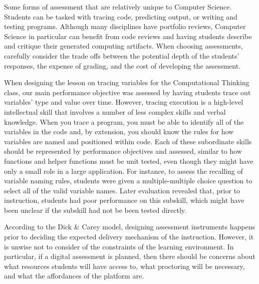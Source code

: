 Some forms of assessment that are relatively unique to Computer Science.
Students can be tasked with tracing code, predicting output, or writing and testing programs.
Although many disciplines have portfolio reviews, Computer Science in particular can benefit from code reviews and having students describe and critique their generated computing artifacts.
When choosing assessments, carefully consider the trade offs between the potential depth of the students' responses, the expense of grading, and the cost of developing the assessment.


When designing the lesson on tracing variables for the Computational Thinking class, our main performance objective was assessed by having students trace out variables' type and value over time.
However, tracing execution is a high-level intellectual skill that involves a number of less complex skills and verbal knowledge. 
When you trace a program, you must be able to identify all of the variables in the code and, by extension, you should know the rules for how variables are named and positioned within code.
Each of these subordinate skills should be represented by performance objectives and assessed, similar to how functions and helper functions must be unit tested, even though they might have only a small role in a large application.
For instance, to assess the recalling of variable naming rules, students were given a multiple-multiple choice question  to select all of the valid variable names.
Later evaluation revealed that, prior to instruction, students had poor performance on this subskill, which might have been unclear if the subskill had not be been tested directly.

According to the Dick \& Carey model, designing assessment instruments happens prior to deciding the expected delivery mechanism of the instruction.
However, it is unwise not to consider of the constraints of the learning environment.
In particular, if a digital assessment is planned, then there should be concerns about what resources students will have access to, what proctoring will be necessary, and what the affordances of the platform are.


